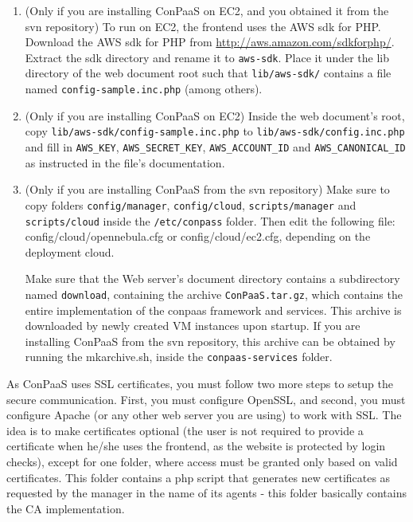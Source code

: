 \documentclass[10pt]{article}
\begin{document}
\begin{enumerate}
  \item (Only if you are installing ConPaaS on EC2, and you obtained it 
  from the svn repository) To run on EC2, the frontend uses the AWS
  sdk for PHP. Download the AWS sdk for PHP from
  \url{http://aws.amazon.com/sdkforphp/}.  Extract the sdk directory
  and rename it to \verb+aws-sdk+. Place it under the lib directory of
  the web document root such that \verb+lib/aws-sdk/+ contains a
  file named \verb+config-sample.inc.php+ (among others).

  \item (Only if you are installing ConPaaS on EC2) 
  Inside the web document's root, copy
  \verb+lib/aws-sdk/config-sample.inc.php+ to
  \verb+lib/aws-sdk/config.inc.php+ and fill in \verb+AWS_KEY+,
  \verb+AWS_SECRET_KEY+, \verb+AWS_ACCOUNT_ID+ and
  \verb+AWS_CANONICAL_ID+ as instructed in the file's documentation.

  \item (Only if you are installing ConPaaS from the svn repository)
  Make sure to copy folders \verb+config/manager+, \verb+config/cloud+,
  \verb+scripts/manager+ and \verb+scripts/cloud+ inside the 
  \verb+/etc/conpass+ folder. Then edit the 
  following file: config/cloud/opennebula.cfg or config/cloud/ec2.cfg,
  depending on the deployment cloud.

  Make sure that the Web server's document directory contains a
  subdirectory named \verb+download+, containing the archive
  \verb+ConPaaS.tar.gz+, which contains the entire implementation
  of the conpaas framework and services. This archive is downloaded by newly
  created VM instances upon startup. If you are installing ConPaaS from the svn
  repository, this archive can be obtained
  by running the mkarchive.sh, inside the \verb+conpaas-services+ folder.

\end{enumerate}

As ConPaaS uses SSL certificates, you must follow two more steps to setup
the secure communication. First, you must configure OpenSSL, and second,
you must configure Apache (or any other web server you are using)
to work with SSL. The idea is to make certificates optional (the user
is not required to provide a certificate
when he/she uses the frontend, as the website is protected by login checks),
except for one folder, where access must be granted only based on
valid certificates. This folder contains a php script that generates new
certificates as requested by the manager in the name of its agents
- this folder basically contains the CA implementation.
\end{document}
